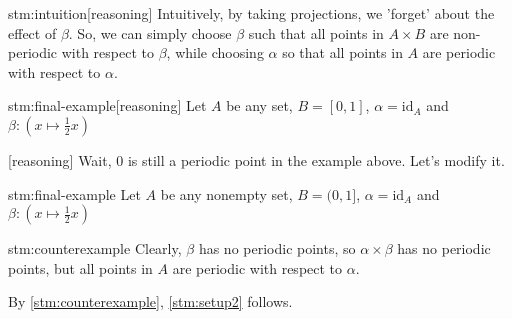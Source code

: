 \begin{stm}{stm:intuition}[reasoning]
Intuitively, by taking projections, we 'forget' about the effect of $\beta$. So, we can simply choose $\beta$ such that all points in $A \times B$ are non-periodic with respect to $\beta$, while choosing $\alpha$ so that all points in $A$ are periodic with respect to $\alpha$. 
\end{stm}

\begin{stm}{stm:final-example}[reasoning]
Let $A$ be any set, $B = [0,1]$, $\alpha = \mathrm{id}_A$ and $\beta: (x \mapsto \frac{1}{2}x)$
\end{stm}

\begin{stm}{}[reasoning]
Wait, $0$ is still a periodic point in the example above. Let's modify it.
\end{stm}

\begin{stm}{stm:final-example}
    Let $A$ be any nonempty set, $B = (0,1]$, $\alpha = \mathrm{id}_A$ and $\beta: (x \mapsto \frac{1}{2}x)$
\end{stm}
    
\begin{stm}{stm:counterexample}
Clearly, $\beta$ has no periodic points, so $\alpha \times \beta$ has no periodic points, but all points in $A$ are periodic with respect to $\alpha$. 
\end{stm}

\begin{stm}{}
By \ref{stm:counterexample}, \ref{stm:setup2} follows.
\end{stm}